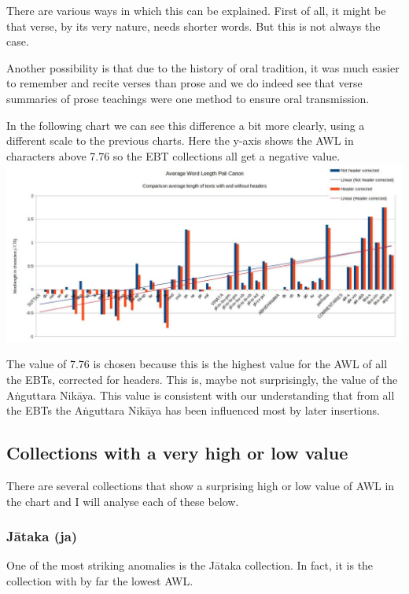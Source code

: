 There are various ways in which this can be explained. First of all, it might be that verse, by its very nature, needs shorter words. But this is not always the case.

Another possibility is that due to the history of oral tradition, it was much easier to remember and recite verses than prose and we do indeed see that verse summaries of prose teachings were one method to ensure oral transmission.

In the following chart we can see this difference a bit more clearly, using a different scale to the previous charts. Here the y-axis shows the AWL in characters above 7.76 so the EBT collections all get a negative value.\\

\includegraphics[width=\linewidth]{chart3.jpg}
\label{chart3}

\medskip
The value of 7.76 is chosen because this is the highest value for the AWL of all the EBTs, corrected for headers. This is, maybe not surprisingly, the value of the Aṅguttara Nikāya. This value is consistent with our understanding that from all the EBTs the Aṅguttara Nikāya has been influenced most by later insertions.

\subsection{Collections with a very high or low value}
There are several collections that show a surprising high or low value of AWL in the chart and I will analyse each of these below.

\subsubsection{Jātaka (ja)}
One of the most striking anomalies is the Jātaka collection. In fact, it is the collection with by far the lowest AWL.

